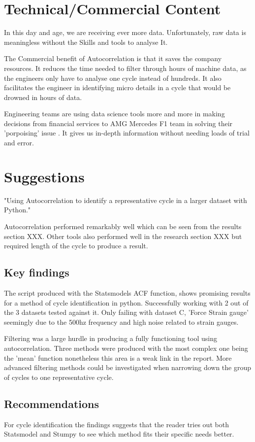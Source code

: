 \section{Technical/Commercial Content}

In this day and age, we are receiving ever more data. Unfortunately, raw data is meaningless without the Skills and tools to analyse It.

The Commercial benefit of Autocorrelation is that it saves the company resources. It reduces the time needed to filter through hours of machine data, as the engineers only have to analyse one cycle instead of hundreds. It also facilitates the engineer in identifying micro details in a cycle that would be drowned in hours of data. 

Engineering teams are using data science tools more and more in making decisions from financial services to AMG Mercedes F1 team in solving their 'porpoising' issue \cite{mercedes}. It gives us in-depth information without needing loads of trial and error.

\section{Suggestions}
"Using Autocorrelation to identify a representative
cycle in a larger dataset with Python."

Autocorrelation performed remarkably well which can be seen from the results section XXX. Other tools also performed well in the research section XXX but required length of the cycle to produce a result.

\subsection{Key findings}
The script produced with the Statsmodels ACF function, shows promising results for a method of cycle identification in python. Successfully working with 2 out of the 3 datasets tested against it. Only failing with dataset C, 'Force Strain gauge' seemingly due to the 500hz frequency and high noise related to strain gauges.

Filtering was a large hurdle in producing a fully functioning tool using autocorrelation. Three methods were produced with the most complex one being the 'mean' function nonetheless this area is a weak link in the report. More advanced filtering methods could be investigated when narrowing down the group of cycles to one representative cycle. 

\subsection{Recommendations}
For cycle identification the findings suggests that the reader tries out both Statsmodel and Stumpy  to see which method fits their specific needs better. 


